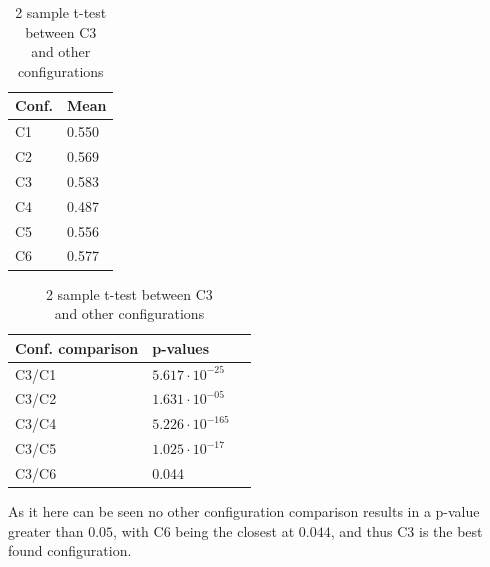 \begin{table}[!htb]
    \begin{minipage}{.5\linewidth}
		\centering
		\caption{Mean for all configurations C1-C6}
		\label{tab:mean-and-variance}
        \begin{tabular}{|l|l|} \hline
					Conf.         &  Mean  \\ \hline
					C1            &  0.550 \\
					C2            &  0.569 \\
					C3            &  0.583 \\
					C4            &  0.487 \\
					C5            &  0.556 \\
					C6            &  0.577 \\\hline
        \end{tabular}
    \end{minipage}%
	\hspace{0.3cm}
	\begin{minipage}{.5\linewidth}
      \centering
	  \caption{2 sample t-test between C3 \\ and other configurations}
	  \label{tab:2-sample-t-test}
	  	\begin{tabular}{|l|l|l|}\hline
				  Conf. comparison & p-values    \\ \hline
				  C3/C1 & $5.617\cdot 10^{-25 }$ \\
				  C3/C2 & $1.631\cdot 10^{-05 }$ \\
				  C3/C4 & $5.226\cdot 10^{-165}$ \\
				  C3/C5 & $1.025\cdot 10^{-17 }$ \\
				  C3/C6 & 0.044 \\ \hline
		\end{tabular}
	\end{minipage} 
\end{table}
As it here can be seen no other configuration comparison results in a p-value greater than
$0.05$, with C6 being the closest at $0.044$, and thus C3 is the best found configuration.\par

